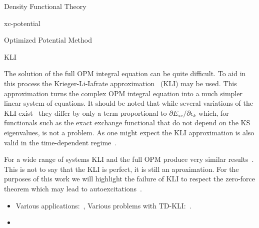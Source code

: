 \documentclass[letterpaper, 12 pt]{report}
\begin{document}
\begin{chapter}{Density Functional Theory \label{chap:dft}}
\begin{section}{xc-potential \label{sec:xcpot}}
\begin{subsection}{Optimized Potential Method \label{sec:opm}}
      \end{subsection}

      \begin{subsection}{KLI \label{sec:kli}}

         The solution of the full OPM integral equation can be quite difficult. To aid in this process
         the Krieger-Li-Iafrate approximation~\cite{kli1} (KLI) may be used. This approximation turns
         the complex OPM integral equation into a much simpler linear system of equations. It should
         be noted that while several variations of the KLI exist~\cite{kli1, kli2, kli3} they differ
         by only a term proportional to $\partial E_\mathrm{xc} / \partial \epsilon_k$ which, for
         functionals such as the exact exchange functional that do not depend on the KS eigenvalues,
         is not a problem. As one might expect the KLI approximation is also valid in the time-dependent
         regime~\cite{tdkli1, tdkli2, tdkli3}.
         
         For a wide range of systems KLI and the full OPM produce very similar results~\cite{opm-rev}.
         This is not to say that the KLI is perfect, it is still an aproximation. For the purposes of 
         this work we will highlight the failure of KLI to respect the zero-force theorem which may lead
         to autoexcitations~\cite{kli-zero-force}.

      \end{subsection}

   \end{section}

   \begin{itemize}

      \item Various applications:~\cite[p. 254]{dft-engel},
         Various problems with TD-KLI:~\cite[p. 135-136]{tddft}.

      \item {\color{red}{Should I add more detail?}} %

   \end{itemize}

\end{chapter}
\end{document}
